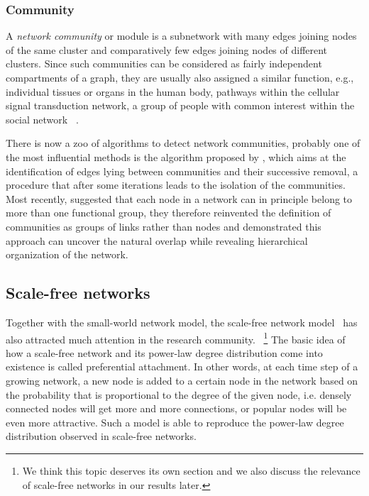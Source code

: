 \subsubsection{Community}
A \emph{network community} or module is a subnetwork with many edges joining
nodes of the same cluster and comparatively few edges joining nodes of 
different clusters. Since such communities can be considered as fairly 
independent compartments of a graph, they are usually also assigned 
a similar function, e.g., individual tissues or organs in the human body,
pathways within the cellular signal transduction network, a group of people
with common interest within the social network~%
\citep{Fortunato2010,Newman2012}.

There is now a zoo of algorithms to detect network communities, probably one
of the most influential methods is the algorithm proposed by \cite{Girvan2002},
which aims at the identification of edges lying between communities and their 
successive removal, a procedure that after some iterations
leads to the isolation of the communities. Most recently, \cite{Ahn2010b} 
suggested that each node in a network can in principle belong to more than 
one functional group, they therefore reinvented the definition of communities 
as groups of links rather than nodes and demonstrated this approach can uncover
the natural overlap while revealing hierarchical organization of the network.

\subsection{Scale-free networks}
\label{sec:scale_free}
Together with the small-world network model, the scale-free network model~%
\citep{Barabasi1999} has
also attracted much attention in the research community.~%
\footnote{We think this topic deserves its own section and we also discuss
the relevance of scale-free networks in our results later.}
The basic idea of 
how a scale-free network and its power-law degree distribution come into
existence is called preferential attachment. In other words, at each time
step of a growing network, a new node is added to a certain node in the 
network based on the probability that is proportional to the degree of the
given node, i.e. densely connected nodes will get more and more connections, or
popular nodes will be even more attractive. Such a model is able to reproduce
the power-law degree distribution observed in scale-free networks.

